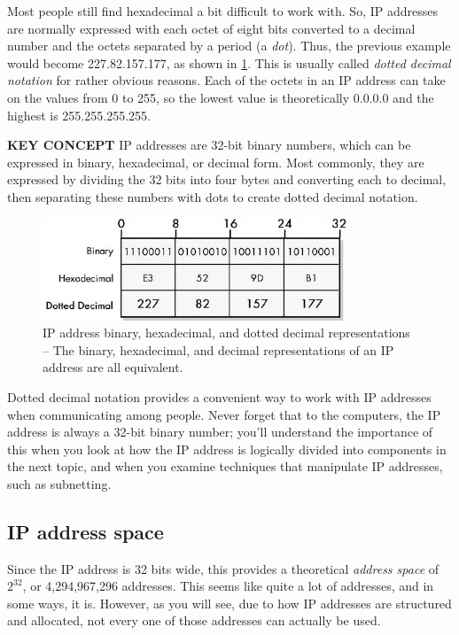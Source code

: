 Most people still find hexadecimal a bit difficult to work with.
So, IP addresses are normally expressed with each octet of eight bits converted to a
decimal number and the octets separated by a period (a {\emph{dot}}).
Thus, the previous example would become 227.82.157.177, as shown in \cref{fig:ip-address-notation}.
This is usually called {\emph{dotted decimal notation}} for rather
obvious reasons. Each of the octets in an IP address can take on the
values from 0 to 255, so the lowest value is theoretically 0.0.0.0 and
the highest is 255.255.255.255.

{\textbf{KEY CONCEPT}} IP addresses are 32-bit binary numbers, which can
be expressed in binary, hexadecimal, or decimal form. Most commonly,
they are expressed by dividing the 32 bits into four bytes and
converting each to decimal, then separating these numbers with dots to
create dotted decimal notation.

\begin{figure}
   \centering
   \includegraphics[width=.7\textwidth]{images/ip-address-notation.jpg}
   \caption{IP address binary, hexadecimal, and dotted decimal representations -- The binary, hexadecimal, and decimal representations of an IP address are all equivalent.}
   \label{fig:ip-address-notation}
\end{figure}

Dotted decimal notation provides a convenient way to work with
\protect\hypertarget{ch16s02.htmlux5cux23idx-CHP-16-0658}{}{}IP
addresses when communicating among people. Never forget that to the
computers, the IP address is always a 32-bit
\protect\hypertarget{ch16s02.htmlux5cux23idx-CHP-16-0659}{}{}binary
number; you'll understand the importance of this when you look at how
the IP address is logically divided into components in the next topic,
and when you examine techniques that manipulate IP addresses, such as
subnetting.



\subsection{IP address space}

Since the IP address is 32 bits wide, this provides a theoretical {\emph{address
space}} of $2^{32}$, or 4,294,967,296 addresses.
This seems like quite a lot of addresses, and in some ways, it is.
However, as you will see, due to how IP addresses are structured and allocated, not every one of those addresses can actually be used.

